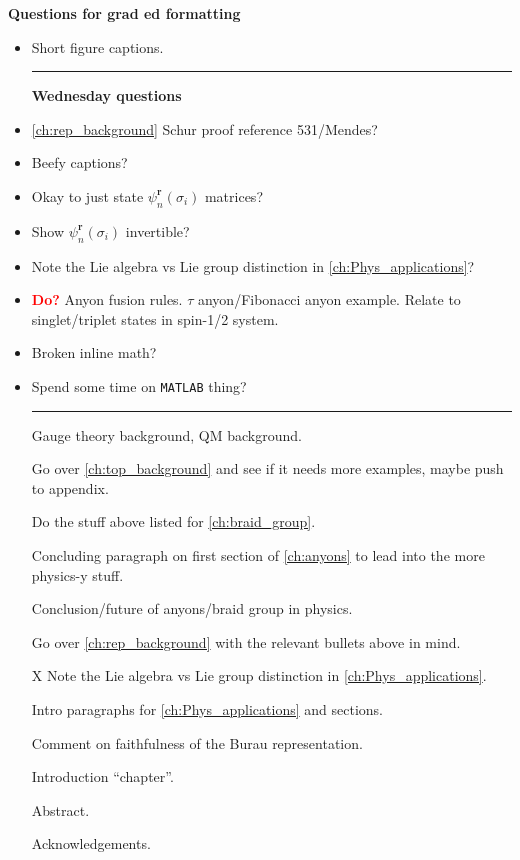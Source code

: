 \textbf{Questions for grad ed formatting}
\begin{itemize}
    \item Short figure captions.
    
    \begin{center}\rule{.85\textwidth}{0.65pt}\end{center}
    \textbf{Wednesday questions}
    \item \cref{ch:rep_background} Schur proof reference 531/Mendes?
    \item Beefy captions?
    \item Okay to just state $\psi_n^\textbf{r}(\sigma_i)$ matrices?
    \item Show $\psi_n^\textbf{r}(\sigma_i)$ invertible?
    \item Note the Lie algebra vs Lie group distinction in \cref{ch:Phys_applications}?
    \item \textbf{\textcolor{red}{Do?}} Anyon fusion rules. $\tau$ anyon/Fibonacci anyon example. Relate to singlet/triplet states in spin-1/2 system.
    \item Broken inline math?
    \item \textcolor{black!50!white}{Spend some time on \texttt{MATLAB} thing?}

    \begin{center}\rule{.85\textwidth}{0.65pt}\end{center}
    \item[\checkmark] Gauge theory background, QM background.
    \item[\checkmark] Go over \cref{ch:top_background} and see if it needs more examples, maybe push to appendix.
    \item[\checkmark] Do the stuff above listed for \cref{ch:braid_group}.
    \item[\checkmark] Concluding paragraph on first section of \cref{ch:anyons} to lead into the more physics-y stuff.
    \item[\checkmark] Conclusion/future of anyons/braid group in physics.
    \item[\checkmark] Go over \cref{ch:rep_background} with the relevant bullets above in mind.
    \item[X] Note the Lie algebra vs Lie group distinction in \cref{ch:Phys_applications}.
    \item[\checkmark] Intro paragraphs for \cref{ch:Phys_applications} and sections.
    \item[\checkmark] Comment on faithfulness of the Burau representation.
    \item[\checkmark] Introduction ``chapter''.
    \item[\checkmark] Abstract.
    \item[\checkmark] Acknowledgements.
\end{itemize}
